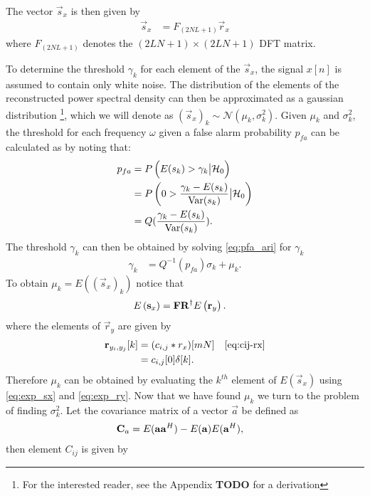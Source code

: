 \documentclass[a4paper, openany, oneside]{memoir}
\begin{document}
The vector $\vec{s}_x$ is then given by
\begin{align}
\vec{s}_x &= F_{(2NL+1)}\vec{r}_x
\end{align}
where $F_{(2NL+1)}$ denotes the $(2LN+1)\times (2LN+1)$ DFT matrix. 

To determine the threshold $\gamma_{k}$ for each element of the $\vec{s}_x$, the signal $x[n]$ is assumed to contain only white noise. The distribution of the elements of the reconstructed power spectral density can then be approximated as a gaussian distribution \footnote{For the interested reader, see the Appendix \textbf{TODO} for a derivation}, which we will denote as $(\vec{s}_x)_k \sim \mathcal{N}(\mu_k, \sigma_k^2)$.
Given $\mu_k$ and $\sigma^2_k$, the threshold for each frequency $\omega$ given a false alarm probability $p_{fa}$ can be calculated as by noting that:
\begin{align}\label{eq:pfa_ari}
p_{fa} &= P\left(E(s_k) > \gamma_k \big| \mathcal{H}_0\right) \\
&= P\left(0 > \frac{\gamma_k -E(s_k)}{\operatorname{Var}(s_k)} \big| \mathcal{H}_0\right) \nonumber \\
&= Q(\frac{\gamma_k -E(s_k)}{\operatorname{Var}(s_k)}) \nonumber.
\end{align}
The threshold $\gamma_k$ can then be obtained by solving \cref{eq:pfa_ari} for $\gamma_k$
\begin{align*}
\gamma_k &= Q^{-1}(p_{fa})\sigma_k + \mu_k.
\end{align*}
To obtain $\mu_k = E\left((\vec{s}_x)_k\right)$ notice that
\begin{align}\label{eq:exp_sx}
E\left(\boldsymbol{\mathbf{s}}_x\right) &= \boldsymbol{\mathbf{F}}\boldsymbol{\mathbf{R}}^{\dagger}E\left(\boldsymbol{\mathbf{r}}_y\right).
\end{align} where the elements of $\vec{r}_y$ are given by 
\begin{align}\label{eq:exp_ry}
\vec{r}_{y_i, y_j}[k] &= (c_{i,j} \ast r_x)[mN]& \text{\cref{eq:cij-rx}} \\
&= c_{i,j}[0]\delta[k]. \nonumber
\end{align}
Therefore $\mu_k$ can be obtained by evaluating the $k^{th}$ element of $E\left(\vec{s}_x\right)$ using \cref{eq:exp_sx} and \cref{eq:exp_ry}.
Now that we have found $\mu_k$ we turn to the problem of finding $\sigma^2_k$. Let the covariance matrix of a vector $\vec{a}$ be defined as
\begin{align}\label{eq:cov_mat}
\boldsymbol{\mathbf{C}}_a &= E(\boldsymbol{\mathbf{a}}\boldsymbol{\mathbf{a}}^H) - E(\boldsymbol{\mathbf{a}})E(\boldsymbol{\mathbf{a}}^H),
\end{align}
then element $C_{ij}$ is given by
\end{document}

